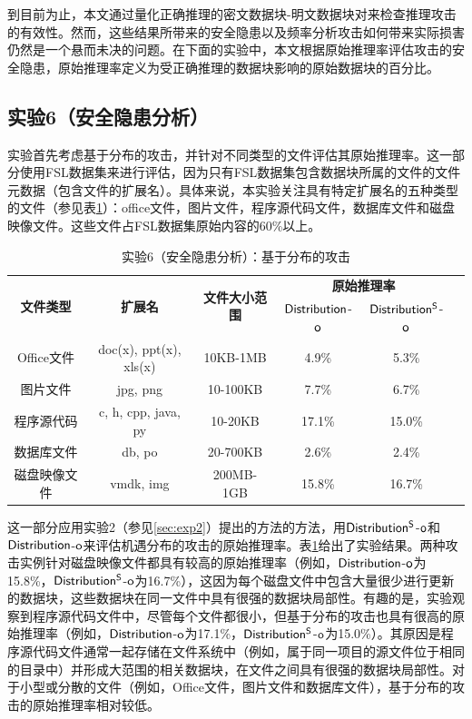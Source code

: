 到目前为止，本文通过量化正确推理的密文数据块-明文数据块对来检查推理攻击的有效性。然而，这些结果所带来的安全隐患以及频率分析攻击如何带来实际损害仍然是一个悬而未决的问题。在下面的实验中，本文根据原始推理率评估攻击的安全隐患，原始推理率定义为受正确推理的数据块影响的原始数据块的百分比。

\subsection{实验6（安全隐患分析）}
\label{sec:exp6}
实验首先考虑基于分布的攻击，并针对不同类型的文件评估其原始推理率。这一部分使用FSL数据集来进行评估，因为只有FSL数据集包含数据块所属的文件的文件元数据（包含文件的扩展名）。具体来说，本实验关注具有特定扩展名的五种类型的文件（参见表\ref{tab:exp-fsl-file-dis}）：office文件，图片文件，程序源代码文件，数据库文件和磁盘映像文件。这些文件占FSL数据集原始内容的60\%以上。

\begin{table}[!htbp]
\small
\caption{实验6（安全隐患分析）：基于分布的攻击}
\label{tab:exp-fsl-file-dis}
\centering
\begin{tabular}{|c|c|c|c|c|c|}
\hline

    \multirow{2}{*}{\bf 文件类型} & \multirow{2}{*}{\bf 扩展名} & \multirow{2}{*}{\bf \centering 文件大小范围}  & \multicolumn{2}{c|}{\bf 原始推理率} \\ \cline{4-5} 
    & & &  $\sf Distribution$-$\sf o$ & $\sf Distribution^S$-$\sf o$ \\ \hline
    Office文件 & doc(x), ppt(x), xls(x) & 10KB-1MB   & 4.9\% & 5.3\%\\
\hline
    图片文件 & jpg, png &10-100KB  & 7.7\% & 6.7\% \\
\hline
    程序源代码 & c, h, cpp, java, py & 10-20KB   & 17.1\% & 15.0\%\\
\hline
    数据库文件 & db, po & 20-700KB   & 2.6\% & 2.4\%\\
\hline
    磁盘映像文件 & vmdk, img & 200MB-1GB  & 15.8\% & 16.7\%\\
\hline
\end{tabular}
\end{table}


这一部分应用实验2（参见\ref{sec:exp2}）提出的方法的方法，用$\sf Distribution^S$-$\sf o$和$\sf Distribution$-$\sf o$来评估机遇分布的攻击的原始推理率。表\ref{tab:exp-fsl-file-dis}给出了实验结果。两种攻击实例针对磁盘映像文件都具有较高的原始推理率（例如，$\sf Distribution$-$\sf o$为15.8\%，$\sf Distribution^S$-$\sf o$为16.7\%），这因为每个磁盘文件中包含大量很少进行更新的数据块，这些数据块在同一文件中具有很强的数据块局部性。有趣的是，实验观察到程序源代码文件中，尽管每个文件都很小，但基于分布的攻击也具有很高的原始推理率（例如，$\sf Distribution$-$\sf o$为17.1\%，$\sf Distribution^S$-$\sf o$为15.0\%）。其原因是程序源代码文件通常一起存储在文件系统中（例如，属于同一项目的源文件位于相同的目录中）并形成大范围的相关数据块，在文件之间具有很强的数据块局部性。对于小型或分散的文件（例如，Office文件，图片文件和数据库文件），基于分布的攻击的原始推理率相对较低。

